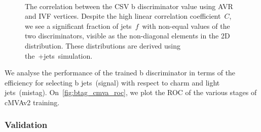 \begin{figure}
\begin{centering}
 \\
\caption{The correlation between the CSV b discriminator value using AVR and IVF vertices. Despite the high linear correlation coefficient~$C$, we see a significant fraction of jets~$f$~with non-equal values of the two discriminators, visible as the non-diagonal elements in the 2D distribution. These distributions are derived using the~\ttbar+jets~simulation.}
\label{fig:btag_csv_correlation}
\end{centering}
\end{figure}

We analyse the performance of the trained b discriminator in terms of the efficiency for selecting b jets~(signal) with respect to charm and light jets~(mistag). On~\cref{fig:btag_cmva_roc}, we plot the ROC of the various stages of cMVAv2 training.
\subsubsection{Validation}